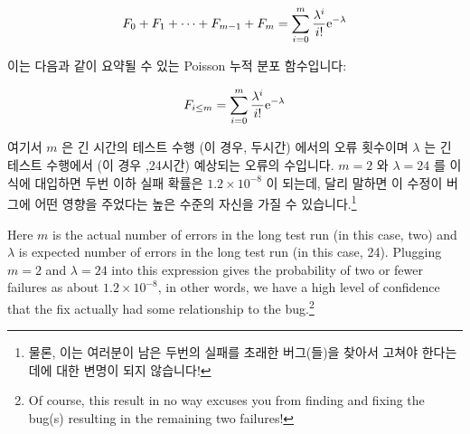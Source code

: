 \begin{equation}
	F_0 + F_1 + \dots + F_{m - 1} + F_m =
		\sum_{i=0}^m \frac{\lambda^i}{i!} \mathrm{e}^{-\lambda}
\end{equation}

이는 다음과 같이 요약될 수 있는 Poisson 누적 분포 함수입니다:

\begin{equation}
	F_{i \le m} = \sum_{i=0}^m \frac{\lambda^i}{i!} \mathrm{e}^{-\lambda}
\label{eq:debugging:Possion CDF}
\end{equation}

여기서 $m$ 은 긴 시간의 테스트 수행 (이 경우, 두시간) 에서의 오류 횟수이며
$\lambda$ 는 긴 테스트 수행에서 (이 경우 ,24시간) 예상되는 오류의 수입니다.
$m=2$ 와 $\lambda=24$ 를 이 식에 대입하면 두번 이하 실패 확률은 $1.2 \times
10^{-8}$ 이 되는데, 달리 말하면 이 수정이 버그에 어떤 영향을 주었다는 높은
수준의 자신을 가질 수 있습니다.\footnote{
	물론, 이는 여러분이 남은 두번의 실패를 초래한 버그(들)을 찾아서 고쳐야
	한다는데에 대한 변명이 되지 않습니다!}

\iffalse

Here $m$ is the actual number of errors in the long test run
(in this case, two) and $\lambda$ is expected number of errors
in the long test run (in this case, 24).
Plugging $m=2$ and $\lambda=24$ into this expression gives the probability
of two or fewer failures as about
$1.2 \times 10^{-8}$, in other words, we have a high level of confidence
that the fix actually had some relationship to the bug.\footnote{
	Of course, this result in no way excuses you from finding and
	fixing the bug(s) resulting in the remaining two failures!}

